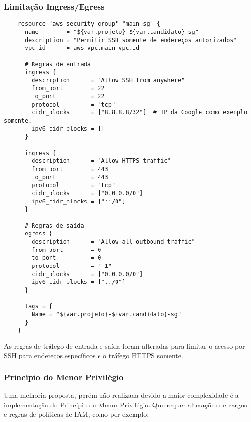 \documentclass{article}
\begin{document}
\subsubsection{Limitação Ingress/Egress}
\begin{verbatim}
    resource "aws_security_group" "main_sg" {
      name        = "${var.projeto}-${var.candidato}-sg"
      description = "Permitir SSH somente de endereços autorizados"
      vpc_id      = aws_vpc.main_vpc.id

      # Regras de entrada
      ingress {
        description      = "Allow SSH from anywhere"
        from_port        = 22
        to_port          = 22
        protocol         = "tcp"
        cidr_blocks      = ["8.8.8.8/32"]  # IP da Google como exemplo somente.
        ipv6_cidr_blocks = []
      }

      ingress {
        description      = "Allow HTTPS traffic"
        from_port        = 443
        to_port          = 443
        protocol         = "tcp"
        cidr_blocks      = ["0.0.0.0/0"]
        ipv6_cidr_blocks = ["::/0"]
      }

      # Regras de saída
      egress {
        description      = "Allow all outbound traffic"
        from_port        = 0
        to_port          = 0
        protocol         = "-1"
        cidr_blocks      = ["0.0.0.0/0"]
        ipv6_cidr_blocks = ["::/0"]
      }

      tags = {
        Name = "${var.projeto}-${var.candidato}-sg"
      }
    }
\end{verbatim}

As regras de tráfego de entrada e saída foram alteradas para limitar o acesso por SSH para endereços específicos e o tráfego HTTPS somente.

\subsubsection{Princípio do Menor Privilégio}
Uma melhoria proposta, porém não realizada devido a maior complexidade é a implementação do \href{https://www.cloudflare.com/pt-br/learning/access-management/principle-of-least-privilege/}{Princípio do Menor Privilégio}. Que requer alterações de cargos e regras de políticas de IAM, como por exemplo:
\end{document}
